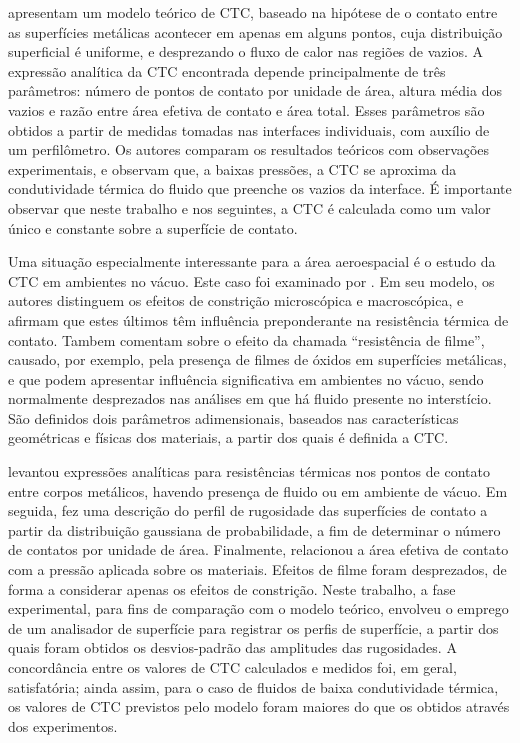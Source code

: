 \cite{artigo_fenech} apresentam um modelo
teórico de CTC, baseado na hipótese de o contato entre as superfícies metálicas acontecer em apenas em alguns pontos, cuja distribuição superficial
é uniforme, e desprezando o fluxo de calor
nas regiões de vazios. A expressão analítica da CTC encontrada depende principalmente de três parâmetros: número de pontos de contato por unidade
de área, altura média dos vazios e razão entre área efetiva de contato e área total. Esses parâmetros são obtidos a partir de medidas tomadas nas
interfaces individuais, com auxílio de um perfilômetro. Os autores comparam os resultados teóricos com observações experimentais, e observam que,
a baixas pressões, a CTC se aproxima da condutividade térmica do fluido que preenche os vazios da interface. É importante observar que neste trabalho
e nos seguintes, a CTC é calculada como um valor único e constante sobre a superfície de contato.

Uma situação especialmente interessante para a área aeroespacial é o estudo da CTC em ambientes no vácuo. Este caso foi examinado por \cite{artigo_clausing}.
Em seu modelo, os autores distinguem os efeitos de constrição microscópica e macroscópica, e afirmam que estes últimos têm influência preponderante
na resistência térmica de contato. Tambem comentam sobre o efeito da chamada ``resistência de filme'', causado, por exemplo, pela presença de
filmes de óxidos em superfícies metálicas, e que podem apresentar influência significativa em ambientes no vácuo, sendo normalmente desprezados
nas análises em que há fluido presente no interstício. São definidos dois parâmetros adimensionais, baseados nas características geométricas e
físicas dos materiais, a partir dos quais é definida a CTC. 

\cite{tese_mikic} levantou expressões analíticas para resistências térmicas nos pontos de contato entre corpos metálicos, havendo presença de
fluido ou em ambiente de vácuo. Em seguida, fez uma descrição do perfil de rugosidade das superfícies de contato
a partir da distribuição gaussiana de probabilidade, a fim de determinar o número de contatos por unidade de área. Finalmente, relacionou a área efetiva de 
contato com a pressão aplicada sobre os materiais. Efeitos de filme foram desprezados, de forma a considerar apenas os efeitos de constrição.
Neste trabalho, a fase experimental, para fins de comparação com o modelo teórico, envolveu o emprego de um analisador de superfície para registrar os perfis de superfície, a partir dos quais foram obtidos
os desvios-padrão das amplitudes das rugosidades. A concordância entre os valores de CTC calculados e medidos foi, em geral, satisfatória; ainda assim,
para o caso de fluidos de baixa condutividade térmica, os valores de CTC previstos pelo modelo foram maiores do que os obtidos através dos experimentos. 


